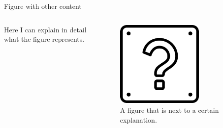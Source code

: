 \documentclass{beamer}
\begin{document}
\begin{frame}{Figure with other content}

\begin{columns}
\begin{column}{0.5\textwidth}
    Here I can explain in detail what the figure represents.
\end{column}

\begin{column}{0.5\textwidth}
  \begin{figure}
  \centering
    \includegraphics[width=0.7\textwidth]{Ques.png}
    \caption{A figure that is next to a certain explanation.}
  \end{figure}
\end{column}

\end{columns}

\end{frame}
\end{document}
